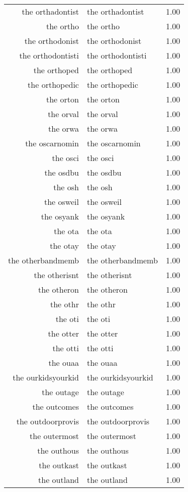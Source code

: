 \begin{table}[ht]
\begin{tabular}{rlr}
  the orthadontist & the orthadontist & 1.00 \\ 
  the ortho & the ortho & 1.00 \\ 
  the orthodonist & the orthodonist & 1.00 \\ 
  the orthodontisti & the orthodontisti & 1.00 \\ 
  the orthoped & the orthoped & 1.00 \\ 
  the orthopedic & the orthopedic & 1.00 \\ 
  the orton & the orton & 1.00 \\ 
  the orval & the orval & 1.00 \\ 
  the orwa & the orwa & 1.00 \\ 
  the oscarnomin & the oscarnomin & 1.00 \\ 
  the osci & the osci & 1.00 \\ 
  the osdbu & the osdbu & 1.00 \\ 
  the osh & the osh & 1.00 \\ 
  the osweil & the osweil & 1.00 \\ 
  the osyank & the osyank & 1.00 \\ 
  the ota & the ota & 1.00 \\ 
  the otay & the otay & 1.00 \\ 
  the otherbandmemb & the otherbandmemb & 1.00 \\ 
  the otherisnt & the otherisnt & 1.00 \\ 
  the otheron & the otheron & 1.00 \\ 
  the othr & the othr & 1.00 \\ 
  the oti & the oti & 1.00 \\ 
  the otter & the otter & 1.00 \\ 
  the otti & the otti & 1.00 \\ 
  the ouaa & the ouaa & 1.00 \\ 
  the ourkidsyourkid & the ourkidsyourkid & 1.00 \\ 
  the outage & the outage & 1.00 \\ 
  the outcomes & the outcomes & 1.00 \\ 
  the outdoorprovis & the outdoorprovis & 1.00 \\ 
  the outermost & the outermost & 1.00 \\ 
  the outhous & the outhous & 1.00 \\ 
  the outkast & the outkast & 1.00 \\ 
  the outland & the outland & 1.00 \\ 

\end{tabular}
\end{table}
